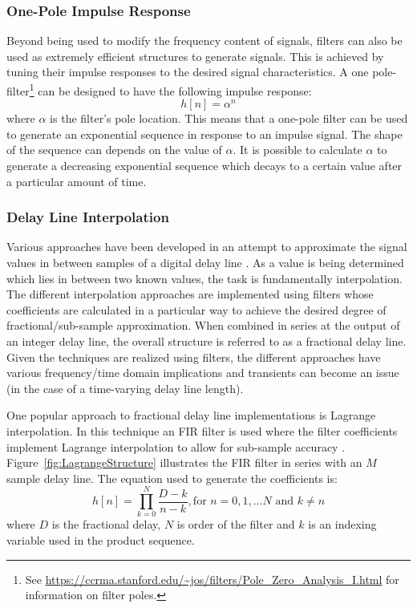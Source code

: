 \documentclass[main.tex]{subfiles}
\begin{document}
\subsubsection{One-Pole Impulse Response}
Beyond being used to modify the frequency content of signals, filters can also be used as extremely efficient structures to generate signals. This is achieved by tuning their impulse responses to the desired signal characteristics. A one pole-filter\footnote{See \url{https://ccrma.stanford.edu/~jos/filters/Pole_Zero_Analysis_I.html} for information on filter poles.} can be designed to have the following impulse response:
\begin{equation}
    h[n] = \alpha^n
\end{equation}
where $\alpha$ is the filter's pole location. This means that a one-pole filter can be used to generate an exponential sequence in response to an impulse signal. The shape of the sequence can depends on the value of $\alpha$. It is possible to calculate $\alpha$ to generate a decreasing exponential sequence which decays to a certain value after a particular amount of time.

\subsubsection{Delay Line Interpolation}
Various approaches have been developed in an attempt to approximate the signal values in between samples of a digital delay line . As a value is being determined which lies in between two known values, the task is fundamentally interpolation. The different interpolation approaches are implemented using filters whose coefficients are calculated in a particular way to achieve the desired degree of fractional/sub-sample approximation. When combined in series at the output of an integer delay line, the overall structure is referred to as a fractional delay line. Given the techniques are realized using filters, the different approaches have various frequency/time domain implications and transients can become an issue (in the case of a time-varying delay line length).

One popular approach to fractional delay line implementations is Lagrange interpolation. In this technique an FIR filter is used where the filter coefficients implement Lagrange interpolation to allow for sub-sample accuracy . Figure~\ref{fig:LagrangeStructure} illustrates the FIR filter in series with an $M$ sample delay line. The equation used to generate the coefficients is:
\begin{equation}
    h[n] = \prod_{k=0}^{N} \frac{D-k}{n-k}, \text{for } n=0, 1, ... N \text{ and } k \ne n
\end{equation}
where $D$ is the fractional delay, $N$ is order of the filter and $k$ is an indexing variable used in the product sequence.
\end{document}
